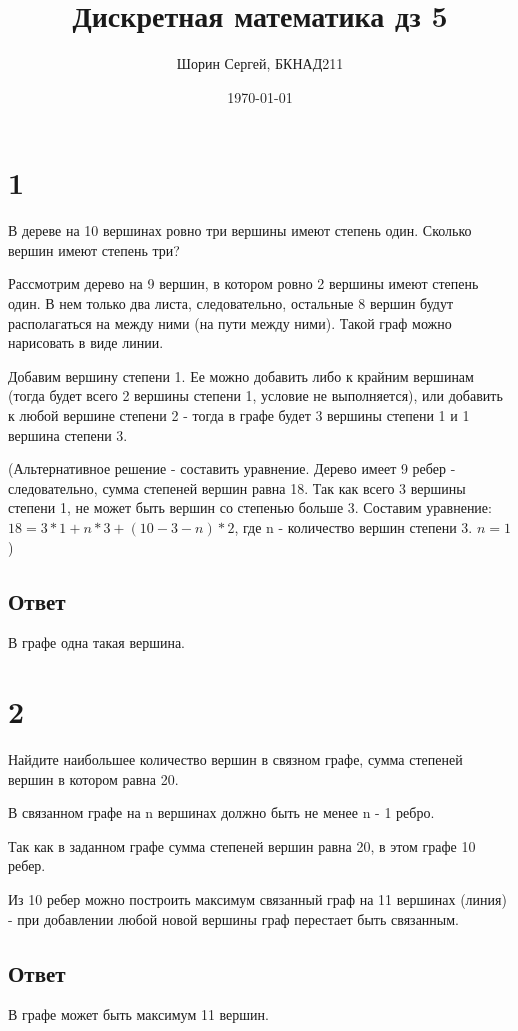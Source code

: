 \documentclass[a4paper]{article}
\author{Шорин Сергей, БКНАД211}
\title{Дискретная математика дз 5}
\date{\today}
\begin{document}
\maketitle

\newpage

\section*{1}
В дереве на 10 вершинах ровно три вершины имеют степень один. Сколько
вершин имеют степень три?

Рассмотрим дерево на 9 вершин, в котором ровно 2 вершины имеют степень один. В нем только два листа, следовательно, остальные 8 вершин будут располагаться на между ними (на пути между ними). Такой граф можно нарисовать в виде линии.

 Добавим вершину степени 1. Ее можно добавить либо к крайним вершинам (тогда будет всего 2 вершины степени 1, условие не выполняется), или добавить к любой вершине степени 2 - тогда в графе будет 3 вершины степени 1 и 1 вершина степени 3.
 
(Альтернативное решение - составить уравнение. Дерево имеет 9 ребер - следовательно, сумма степеней вершин равна  18. Так как всего 3 вершины степени 1, не может быть вершин со степенью больше 3.
Составим уравнение: $18 = 3 * 1 + n * 3 + (10 - 3 -n) * 2$, где n - количество вершин степени 3. $n = 1$)
\subsection*{Ответ}
В графе одна такая вершина.
 

\section*{2}
Найдите наибольшее количество вершин в связном графе, сумма степеней
вершин в котором равна 20.

В связанном графе на n вершинах должно быть не менее n - 1 ребро.


Так как в заданном графе сумма степеней вершин равна 20, в этом графе 10 ребер.

Из 10 ребер можно построить максимум связанный граф на 11 вершинах (линия) - при добавлении любой новой вершины граф перестает быть связанным.

\subsection*{Ответ}
В графе может быть максимум 11 вершин.
\end{document}

